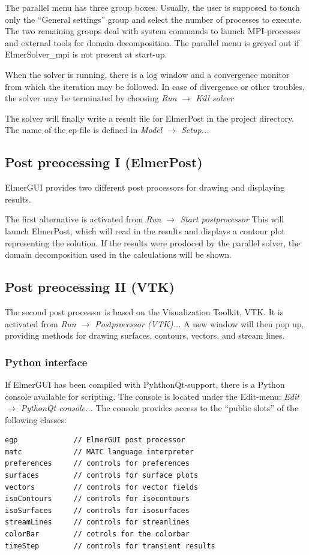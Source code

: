\documentclass[a4paper,12pt]{article}
\newcommand{\menu}[2]{{\it \vskip2mm #1 $\rightarrow$ #2 \vskip2mm}}
\begin{document}
The parallel menu has three group boxes. Usually, the user is supposed to touch
only the ``General settings'' group and select the number of processes to execute.
The two remaining groups deal with system commands to launch MPI-processes and
external tools for domain decomposition.  The parallel menu is greyed out if
ElmerSolver\_mpi is not present at start-up.

When the solver is running, there is a log window and a convergence monitor
from which the iteration may be followed. In case of divergence or other troubles,
the solver may be terminated by choosing
\menu{Run}{Kill solver}

The solver will finally write a result file for ElmerPost in the project directory.
The name of the ep-file is defined in
\menu{Model}{Setup...}

\subsection{Post preocessing I (ElmerPost)}

ElmerGUI provides two different post processors for drawing and displaying results.

The first alternative is activated from
\menu{Run}{Start postprocessor}
\noindent This will launch ElmerPost, which will read in the results and displays
a contour plot representing the solution. If the results were prodoced by the parallel
solver, the domain decomposition used in the calculations will be shown.

\subsection{Post preocessing II (VTK)}

The second post processor is based on the Visualization Toolkit, VTK. It is activated from
\menu{Run}{Postprocessor (VTK)...}
\noindent A new window will then pop up, providing methods for drawing surfaces, contours,
vectors, and stream lines.

\subsubsection{Python interface}

If ElmerGUI has been compiled with PyhthonQt-support, there is a Python console
available for scripting. The console is located under the Edit-menu:
\menu{Edit}{PythonQt console...}
\noindent The console provides access to the ``public slots'' of the following classes:
\begin{footnotesize}
\begin{verbatim}
egp             // ElmerGUI post processor
matc            // MATC language interpreter
preferences     // controls for preferences
surfaces        // controls for surface plots
vectors	        // controls for vector fields
isoContours     // controls for isocontours
isoSurfaces     // controls for isosurfaces
streamLines     // controls for streamlines
colorBar        // cotrols for the colorbar
timeStep        // controls for transient results
\end{verbatim}
\end{footnotesize}
\end{document}
